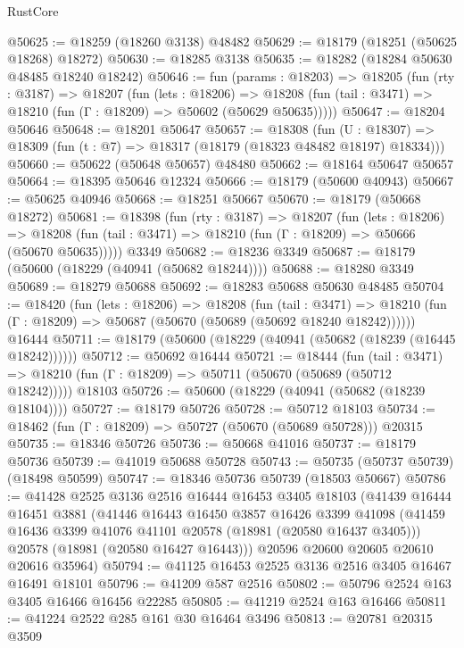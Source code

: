 \begin{lexlean}{RustCore}
\begin{coremodule}
@50625 := @18259 (@18260 @3138) @48482
@50629 := @18179 (@18251 (@50625 @18268) @18272)
@50630 := @18285 @3138
@50635 := @18282 (@18284 @50630 @48485 @18240 @18242)
@50646 := fun (params : @18203) =>
  @18205
    (fun (rty : @3187) =>
    @18207
      (fun (lets : @18206) =>
      @18208 (fun (tail : @3471) => @18210 (fun (Γ : @18209) => @50602 (@50629 @50635)))))
@50647 := @18204 @50646
@50648 := @18201 @50647
@50657 := @18308
    (fun (U : @18307) => @18309 (fun (t : @7) => @18317 (@18179 (@18323 @48482 @18197) @18334)))
@50660 := @50622 (@50648 @50657) @48480
@50662 := @18164 @50647 @50657
@50664 := @18395 @50646 @12324
@50666 := @18179 (@50600 @40943)
@50667 := @50625 @40946
@50668 := @18251 @50667
@50670 := @18179 (@50668 @18272)
@50681 := @18398
    (fun (rty : @3187) =>
    @18207
      (fun (lets : @18206) =>
      @18208 (fun (tail : @3471) => @18210 (fun (Γ : @18209) => @50666 (@50670 @50635)))))
    @3349
@50682 := @18236 @3349
@50687 := @18179 (@50600 (@18229 (@40941 (@50682 @18244))))
@50688 := @18280 @3349
@50689 := @18279 @50688
@50692 := @18283 @50688 @50630 @48485
@50704 := @18420
    (fun (lets : @18206) =>
    @18208
      (fun (tail : @3471) =>
      @18210 (fun (Γ : @18209) => @50687 (@50670 (@50689 (@50692 @18240 @18242))))))
    @16444
@50711 := @18179 (@50600 (@18229 (@40941 (@50682 (@18239 (@16445 @18242))))))
@50712 := @50692 @16444
@50721 := @18444
    (fun (tail : @3471) => @18210 (fun (Γ : @18209) => @50711 (@50670 (@50689 (@50712 @18242)))))
    @18103
@50726 := @50600 (@18229 (@40941 (@50682 (@18239 @18104))))
@50727 := @18179 @50726
@50728 := @50712 @18103
@50734 := @18462 (fun (Γ : @18209) => @50727 (@50670 (@50689 @50728))) @20315
@50735 := @18346 @50726
@50736 := @50668 @41016
@50737 := @18179 @50736
@50739 := @41019 @50688 @50728
@50743 := @50735 (@50737 @50739) (@18498 @50599)
@50747 := @18346 @50736 @50739 (@18503 @50667)
@50786 := @41428
    @2525
    @3136
    @2516
    @16444
    @16453
    @3405
    @18103
    (@41439
      @16444
      @16451
      @3881
      (@41446
        @16443
        @16450
        @3857
        @16426
        @3399
        @41098
        (@41459 @16436 @3399 @41076 @41101 @20578 (@18981 (@20580 @16437 @3405)))
        @20578
        (@18981 (@20580 @16427 @16443)))
      @20596
      @20600
      @20605
      @20610
      @20616
      @35964)
@50794 := @41125 @16453 @2525 @3136 @2516 @3405 @16467 @16491 @18101
@50796 := @41209 @587 @2516
@50802 := @50796 @2524 @163 @3405 @16466 @16456 @22285
@50805 := @41219 @2524 @163 @16466
@50811 := @41224 @2522 @285 @161 @30 @16464 @3496
@50813 := @20781 @20315 @3509

\end{coremodule}
\end{lexlean}
